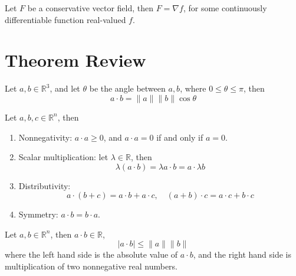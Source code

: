 \documentclass[openany]{book}
\newcommand{\R}{\mathbb{R}}
\begin{document}
\begin{defn}
    Let $F$ be a conservative vector field, then $F=\nabla f$, for some continuously differentiable function real-valued $f$.
\end{defn}











\chapter{Theorem Review}

\begin{prop}\label{dot}
    Let $a,b\in\R^3$, and let $\theta$ be the angle between $a,b$, where $0\leq\theta\leq\pi$, then 
    \begin{equation*}
        a\cdot b=\|a\|\|b\|\cos\theta
    \end{equation*}
\end{prop}




\begin{prop}
    Let $a,b,c\in\R^n$, then 
    \begin{enumerate}
        \item[(a)] Nonnegativity: $a\cdot a\geq 0$, and $a\cdot a=0$ if and only if $a=0$.
        \item[(b)] Scalar multiplication: let $\lambda\in\R$, then 
        \begin{equation*}
            \lambda(a\cdot b)=\lambda a\cdot b=a\cdot \lambda b
        \end{equation*}
        \item[(c)] Distributivity:
        \begin{equation*}
            a\cdot(b+c)=a\cdot b+a\cdot c, \quad (a+b)\cdot c=a\cdot c+b\cdot c
        \end{equation*}
        \item[(d)] Symmetry: $a\cdot b=b\cdot a$.
    \end{enumerate}
\end{prop}



\begin{prop}
    Let $a,b\in\R^n$, then $a\cdot b\in\R$, 
    \begin{equation*}
        |a\cdot b|\leq\|a\|\|b\|
    \end{equation*}
    where the left hand side is the absolute value of $a\cdot b$, and the right hand side is multiplication of two nonnegative real numbers.
\end{prop}
\end{document}
